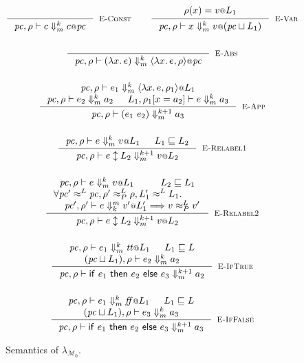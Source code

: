 \documentclass{article}
\makeatletter
\theoremstyle{definition}
\newcommand{\at}{\ensuremath{{\scriptstyle{@}}}}
\newcommand{\pc}{\ensuremath{{\mathit{pc}}}}
\makeatother
\begin{document}
\pagebreak

\begin{figure}[ht]
  \centering
  \begin{gather*}
    \inference{}{
      \pc, \rho |-
      c
      \Downarrow^{k}_{m}
      c \at \pc
    }[\textsc{E-Const}]
    \qquad
    \inference{
      {\begin{array}{l}
          \rho(x) = v \at L_1
        \end{array}}
    }{
      \pc, \rho |-
      x
      \Downarrow^{k}_{m}
      v \at (\pc \sqcup L_1)
    }[\textsc{E-Var}]
    \\[3ex]
    \inference{}{
      \pc, \rho |-
      (\lambda{x}.\, e)
      \Downarrow^{k}_{m}
      \langle{\lambda{x}.\, e, \rho\rangle} \at \pc
    }[\textsc{E-Abs}]
    \\[3ex]
    \inference{
      \pc, \rho |-
      e_1
      \Downarrow^{k}_{m}
      \langle{\lambda{x}.\, e, \rho_1\rangle} \at L_1
      \\
      \pc, \rho |-
      e_2 \Downarrow^{k}_{m} a_2
      &
      L_1, \rho_1[x = a_2] |-
      e
      \Downarrow^{k}_{m}
      a_3
    }{
      \pc, \rho |-
      (e_1\ e_2)
      \Downarrow^{k+1}_{m}
      a_3
    }[\textsc{E-App}]
    \\[3ex]
    \inference{
      \pc, \rho |-
      e
      \Downarrow^{k}_{m}
      v \at L_1
      &
      L_1 \sqsubseteq L_2
    }{
      \pc, \rho |-
      e \updownarrow L_2
      \Downarrow^{k+1}_{m}
      v \at L_2
    }[\textsc{E-Relabel1}]
    \\[3ex]
    \inference{
      \pc, \rho |-
      e
      \Downarrow^{k}_{m}
      v \at L_1
      &
      L_2 \sqsubseteq L_1
      \\
      \forall{\pc' \approx^{L} \pc,
        \rho' \approx^{L}_{P} \rho,
        L_1' \approx^{L} L_1}.
      \qquad\\\quad
      \pc', \rho' |-
      e
      \Downarrow^{m}_{k}
      v' \at L_1'
      ==>
      v \approx^{L}_{P} v'
    }{
      \pc, \rho |-
      e \updownarrow L_2
      \Downarrow^{k+1}_{m}
      v \at L_2
    }[\textsc{E-Relabel2}]
    \\[3ex]
    \inference{
      \pc, \rho |- e_1 \Downarrow^{k}_{m} \mathit{tt} \at L_1
      &
      L_1 \sqsubseteq L
      \\
      (\pc \sqcup L_1), \rho |- e_2 \Downarrow^{k}_{m} a_2
    }{
      \pc, \rho |-
      \mathsf{if}\ e_1\ \mathsf{then}\ e_2\ \mathsf{else}\ e_3
      \Downarrow^{k+1}_{m}
      a_2
    }[\textsc{E-IfTrue}]
    \\[3ex]
    \inference{
      \pc, \rho |- e_1 \Downarrow^{k}_{m} \mathit{ff} \at L_1
      &
      L_1 \sqsubseteq L
      \\
      (\pc \sqcup L_1), \rho |- e_3 \Downarrow^{k}_{m} a_3
    }{
      \pc, \rho |-
      \mathsf{if}\ e_1\ \mathsf{then}\ e_2\ \mathsf{else}\ e_3
      \Downarrow^{k+1}_{m}
      a_3
    }[\textsc{E-IfFalse}]
  \end{gather*}
  \caption{Semantics of $\lambda_{\mathcal{M}_{0}}$.}
  \label{fig:semantics}
\end{figure}
\end{document}
